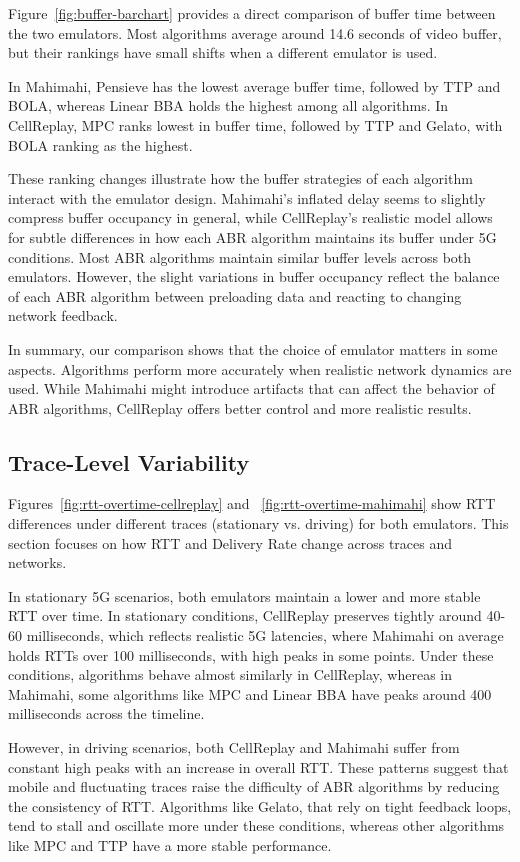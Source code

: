 Figure~\ref{fig:buffer-barchart} provides a direct comparison of buffer time between the two emulators. Most algorithms average around 14.6 seconds of video buffer, but their rankings have small shifts when a different emulator is used.

In Mahimahi, Pensieve has the lowest average buffer time, followed by TTP and BOLA, whereas Linear BBA holds the highest among all algorithms. In CellReplay, MPC ranks lowest in buffer time, followed by TTP and Gelato, with BOLA ranking as the highest.

These ranking changes illustrate how the buffer strategies of each algorithm interact with the emulator design. Mahimahi's inflated delay seems to slightly compress buffer occupancy in general, while CellReplay's realistic model allows for subtle differences in how each ABR algorithm maintains its buffer under 5G conditions. Most ABR algorithms maintain similar buffer levels across both emulators. However, the slight variations in buffer occupancy reflect the balance of each ABR algorithm between preloading data and reacting to changing network feedback.

In summary, our comparison shows that the choice of emulator matters in some aspects. Algorithms perform more accurately when realistic network dynamics are used. While Mahimahi might introduce artifacts that can affect the behavior of ABR algorithms, CellReplay offers better control and more realistic results.

\subsection{Trace-Level Variability}

Figures~\ref{fig:rtt-overtime-cellreplay} and ~\ref{fig:rtt-overtime-mahimahi} show RTT differences under different traces (stationary vs. driving) for both emulators. This section focuses on how RTT and Delivery Rate change across traces and networks.

In stationary 5G scenarios, both emulators maintain a lower and more stable RTT over time. In stationary conditions, CellReplay preserves tightly around 40-60 milliseconds, which reflects realistic 5G latencies, where Mahimahi on average holds RTTs over 100 milliseconds, with high peaks in some points. Under these conditions, algorithms behave almost similarly in CellReplay, whereas in Mahimahi, some algorithms like MPC and Linear BBA have peaks around 400 milliseconds across the timeline. 

However, in driving scenarios, both CellReplay and Mahimahi suffer from constant high peaks with an increase in overall RTT. These patterns suggest that mobile and fluctuating traces raise the difficulty of ABR algorithms by reducing the consistency of RTT. Algorithms like Gelato, that rely on tight feedback loops, tend to stall and oscillate more under these conditions, whereas other algorithms like MPC and TTP have a more stable performance.

